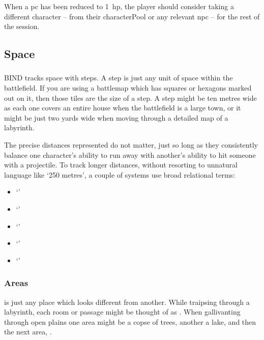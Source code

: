 \begin{multicols}{2}
When a \gls{pc} has been reduced to 1~\gls{hp}, the player should consider taking a different character -- from their \gls{characterPool} or any relevant \gls{npc} -- for the rest of the session.

\subsection{Space}
\label{space}

\subsubsection{}

BIND tracks space with \glspl{step}.
A \gls{step} is just any unit of space within the battlefield.
If you are using a battlemap which has squares or hexagons marked out on it, then those tiles are the size of a step.
A step might be ten metres wide as each one covers an entire house when the battlefield is a large town, or it might be just two yards wide when moving through a detailed map of a labyrinth.

The precise distances represented do not matter, just so long as they consistently balance one character's ability to run away with another's ability to hit someone with a projectile.
To track longer distances, without resorting to unnatural language like `250 metres', a couple of systems use broad relational terms:

\setcounter{spellCost}{2}
\begin{itemize}
  \item
  \toggletrue{distant}
  \setRange{}
  `\spellRange'
  \item
  \setRange{}
  `\spellRange'
  \item
  \setRange{}
  `\spellRange'
  \item
  \setRange{}
  `\spellRange'
  \item
  \setRange{}
  `\spellRange'
\end{itemize}

\subsubsection{Areas}

 is just any place which looks different from another.
While traipsing through a labyrinth, each room or passage might be thought of as .
When gallivanting through open plains one \gls{area} might be a copse of trees, another a lake, and then the next area, .


\end{multicols}
